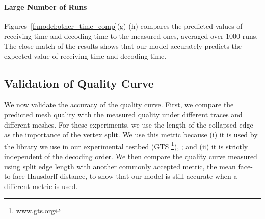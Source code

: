 
    \paragraph*{Large Number of Runs}
    Figures~\ref{f:model:other_time_comp}(g)-(h) compares the predicted values of
    receiving time and decoding time to the measured
    ones, averaged over 1000 runs.
    The close match of the results shows that our model accurately predicts the expected value of 
    receiving time and decoding time.

\subsection{Validation of Quality Curve}
    We now validate the accuracy of the quality curve.  First, we compare
    the predicted mesh quality with the measured quality under 
    different traces and different meshes.  For these experiments,
    we use the length of the collapsed edge as the importance of the vertex 
    split.  We use this metric because 
    (i) it is used by the library we use in our experimental testbed (GTS \footnote{www.gts.org}),
    ; and
    (ii) it is strictly independent of the decoding order. 
    We then compare the quality curve measured using split
    edge length with another commonly accepted metric, 
    the mean face-to-face Hausdorff distance, to show that
    our model is still accurate when a different metric is used.
    
